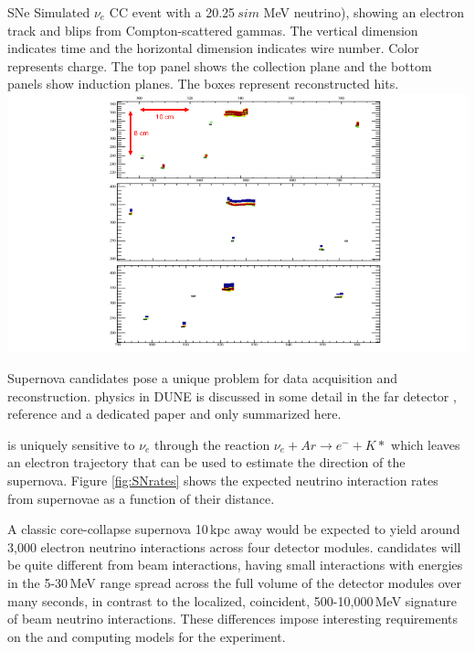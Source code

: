 \documentclass[../main-v1.tex]{subfiles}
\begin{document}
\begin{dunefigure}
{SNe} %
{
 Simulated $\nu_e$
 CC event with a 20.25$~sim$ MeV neutrino), showing an electron track and blips from Compton-scattered gammas. The vertical dimension indicates time and the horizontal dimension indicates wire number. Color represents charge. The top panel shows the collection plane and the bottom panels show induction planes. The boxes represent reconstructed hits. }
\includegraphics[width=\textwidth]{graphics/IntroFigures/nueCC_20-25MeV_event25_2.png} %
\end{dunefigure}



Supernova candidates pose a unique problem for data acquisition and reconstruction.   physics in DUNE is discussed in some detail in the far detector \cite{ Abi:2020evt}, reference \cite{Cuesta:2020dy} and a dedicated paper \cite{DUNE:2020zfm} and only summarized here. 

 is uniquely sensitive to $\nu_e$ through the reaction $\nu_e + Ar \rightarrow e^- + K*$ which leaves an electron trajectory that can be used to estimate the direction of the supernova.  Figure \ref{fig:SNrates} shows the expected neutrino interaction rates from supernovae as a function of their distance.

A classic core-collapse supernova 10\,kpc away would be expected to yield around 3,000   electron neutrino interactions across four detector modules.  candidates will be quite different from beam interactions, having small interactions with energies in the 5-30\,MeV range spread across the full volume of the detector modules over many seconds, in contrast to the localized, coincident,  500-10,000\,MeV signature of beam neutrino interactions. These differences impose interesting requirements on the  and computing models for the experiment.  
\end{document}
